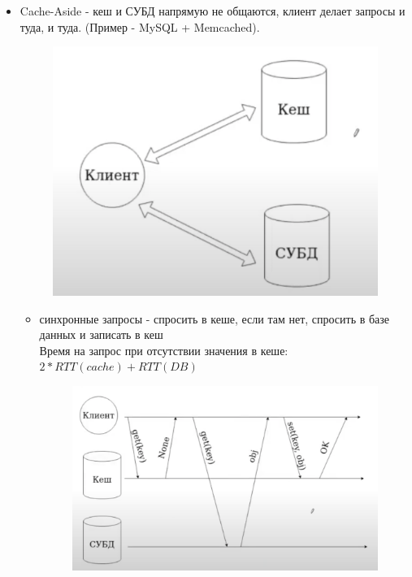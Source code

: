     \begin{itemize}
        \item Cache-Aside - кеш и СУБД напрямую не общаются, клиент делает запросы и туда, и туда. (Пример - MySQL + Memcached).\\
        \begin{figure}[h]
            \centering
            \includegraphics[scale = 0.5]{../assets/18.png}
            \caption{}
        \end{figure}
        \begin{itemize}
            \item синхронные запросы - спросить в кеше, если там нет, спросить в базе данных и записать в кеш \\
            Время на запрос при отсутствии значения в кеше: $2 * RTT(cache) + RTT(DB)$\\
            \begin{figure}[h]
                \centering
                \includegraphics[scale = 0.5]{../assets/19.png}

\end{figure}
\end{itemize}
\end{itemize}

